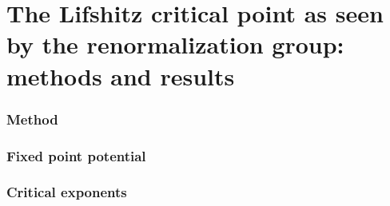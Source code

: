 \chapter{The Lifshitz critical point as seen by the renormalization group: methods and results}

\subsection{Method}

\subsection{Fixed point potential}

\subsection{Critical exponents}